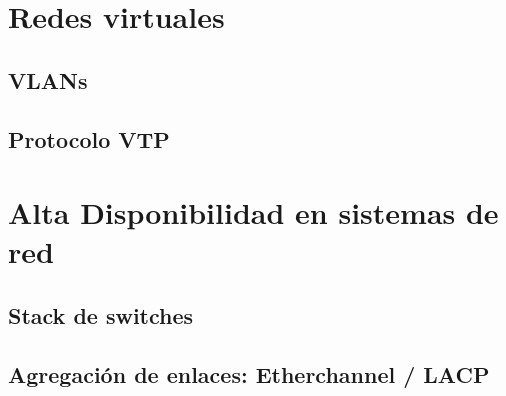 \chapter{Redes virtuales}

\section{VLANs}

\section{Protocolo VTP}



\chapter{Alta Disponibilidad en sistemas de red}

\section{Stack de switches}

\section{Agregación de enlaces: Etherchannel / LACP}